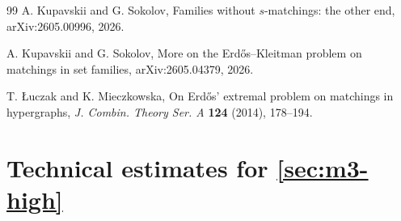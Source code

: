 \documentclass[10pt,a4paper]{article}
\numberwithin{equation}{section}
\theoremstyle{definition}
\begin{document}
\begin{thebibliography}{99}
        A. Kupavskii and G. Sokolov,
        Families without $s$-matchings: the other end,
        arXiv:2605.00996, 2026.

        A. Kupavskii and G. Sokolov,
        More on the Erd\H{o}s--Kleitman problem on matchings in set families,
        arXiv:2605.04379, 2026.

        T. \L{}uczak and K. Mieczkowska,
        On Erd\H{o}s' extremal problem on matchings in hypergraphs,
        \emph{J. Combin. Theory Ser. A} {\bf 124} (2014), 178--194.

\end{thebibliography}


\appendix

\section{Technical estimates for \cref{sec:m3-high}}
\label{app:m3-technical-estimates}
\end{document}
